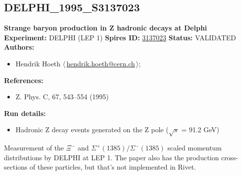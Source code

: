 \subsection[DELPHI\_1995\_S3137023]{DELPHI\_1995\_S3137023\,\cite{Abreu:1995qx}}
\textbf{Strange baryon production in Z hadronic decays at Delphi}\newline
\textbf{Experiment:} DELPHI (LEP 1) \newline
\textbf{Spires ID:} \href{http://www.slac.stanford.edu/spires/find/hep/www?rawcmd=key+3137023}{3137023}\newline
\textbf{Status:} VALIDATED\newline
\textbf{Authors:}
\begin{itemize}
  \item Hendrik Hoeth $\langle\,$\href{mailto:hendrik.hoeth@cern.ch}{hendrik.hoeth@cern.ch}$\,\rangle$;
\end{itemize}
\textbf{References:}
\begin{itemize}
  \item Z. Phys. C, 67, 543--554 (1995)
\end{itemize}
\textbf{Run details:}
\begin{itemize}

  \item Hadronic Z decay events generated on the Z pole (\ensuremath{\sqrt{s}} = 91.2 GeV)\end{itemize}

\noindent Measurement of the $\Xi^-$ and $\Sigma^+(1385)/\Sigma^-(1385)$ scaled momentum distributions by DELPHI at LEP 1. The paper also has the production cross-sections of these particles, but that's not implemented in Rivet.

\clearpage


\clearpage

